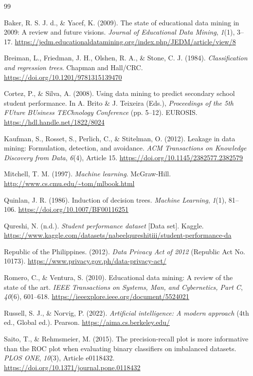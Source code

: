 \documentclass[12pt,a4paper]{article}
\theoremstyle{definition}
\begin{document}
\newpage
\begin{thebibliography}{99}

Baker, R. S. J. d., \& Yacef, K. (2009). The state of educational data mining in 2009: A review and future visions. \textit{Journal of Educational Data Mining}, \textit{1}(1), 3--17. \url{https://jedm.educationaldatamining.org/index.php/JEDM/article/view/8}

Breiman, L., Friedman, J. H., Olshen, R. A., \& Stone, C. J. (1984). \textit{Classification and regression trees}. Chapman and Hall/CRC. \url{https://doi.org/10.1201/9781315139470}

Cortez, P., \& Silva, A. (2008). Using data mining to predict secondary school student performance. In A. Brito \& J. Teixeira (Eds.), \textit{Proceedings of the 5th FUture BUsiness TEChnology Conference} (pp. 5--12). EUROSIS. \url{https://hdl.handle.net/1822/8024}

Kaufman, S., Rosset, S., Perlich, C., \& Stitelman, O. (2012). Leakage in data mining: Formulation, detection, and avoidance. \textit{ACM Transactions on Knowledge Discovery from Data}, \textit{6}(4), Article 15. \url{https://doi.org/10.1145/2382577.2382579}

Mitchell, T. M. (1997). \textit{Machine learning}. McGraw-Hill. \url{http://www.cs.cmu.edu/~tom/mlbook.html}

Quinlan, J. R. (1986). Induction of decision trees. \textit{Machine Learning}, \textit{1}(1), 81--106. \url{https://doi.org/10.1007/BF00116251}

Qureshi, N. (n.d.). \textit{Student performance dataset} [Data set]. Kaggle. \url{https://www.kaggle.com/datasets/nabeelqureshitiii/student-performance-da}

Republic of the Philippines. (2012). \textit{Data Privacy Act of 2012} (Republic Act No. 10173). \url{https://www.privacy.gov.ph/data-privacy-act/}

Romero, C., \& Ventura, S. (2010). Educational data mining: A review of the state of the art. \textit{IEEE Transactions on Systems, Man, and Cybernetics, Part C}, \textit{40}(6), 601--618. \url{https://ieeexplore.ieee.org/document/5524021}

Russell, S. J., \& Norvig, P. (2022). \textit{Artificial intelligence: A modern approach} (4th ed., Global ed.). Pearson. \url{https://aima.cs.berkeley.edu/}

Saito, T., \& Rehmsmeier, M. (2015). The precision-recall plot is more informative than the ROC plot when evaluating binary classifiers on imbalanced datasets. \textit{PLOS ONE}, \textit{10}(3), Article e0118432. \url{https://doi.org/10.1371/journal.pone.0118432}

\end{thebibliography}
\end{document}
